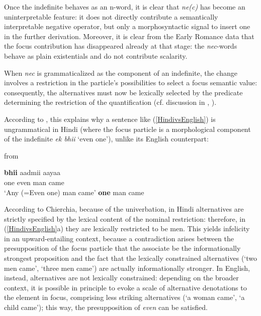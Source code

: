 \documentclass[output=paper,modfonts,nonflat,citecolor=brown,
showindex
]{langsci/langscibook}
\begin{document}
Once the indefinite behaves as an n-word, it is clear that {\emph{ne(c)}} has become an uninterpretable feature: it does not directly contribute a semantically interpretable negative operator, but only a morphosyntactic signal to insert one in the further derivation. Moreover, it is clear from the Early Romance data that the focus contribution has disappeared already at that stage: the {\emph{nec}}-words behave as plain existentials and do not contribute scalarity.

When {\emph{nec}} is grammaticalized as the component of an indefinite, the change involves a restriction in the particle's possibilities to select a focus semantic value: consequently, the alternatives must now be lexically selected by the predicate determining the restriction of the quantification (cf. discussion in \citealt[]{Lahiri98}, \citealt[]{Chierchia13}).

According to \citet[156-157]{Chierchia13}, this explains why a sentence like (\ref{HindivsEnglish}) is ungrammatical in Hindi (where the focus particle is a morphological component of the indefinite {\emph{ek bhii}} `even one'), unlike its English counterpart:

{\begin{exe}
\ex \label{HindivsEnglish} from \citet[156-157]{Chierchia13}
\begin{xlist}
\ex {} {\textbf{bhii}} aadmii aayaa\\ 
one even man came\\
`Any (=Even one) man came'
 {\textbf{one}} man came
\end{xlist}
\end{exe}}

\noindent According to Chierchia, because of the univerbation, in Hindi alternatives are strictly specified by the lexical content of the nominal restriction: therefore, in (\ref{HindivsEnglish}a) they are lexically restricted to be men. This yields infelicity in an upward-entailing context, because a contradiction arises between the presupposition of the focus particle that the associate be the informationally strongest proposition and the fact that the lexically constrained alternatives (`two men came', `three men came') are actually informationally stronger. In English, instead, alternatives are not lexically constrained: depending on the broader context, it is possible in principle to evoke a scale of alternative denotations to the element in focus, comprising less striking alternatives (`a woman came', `a child came'); this way, the presupposition of {\emph{even}} can be satisfied.
\end{document}
